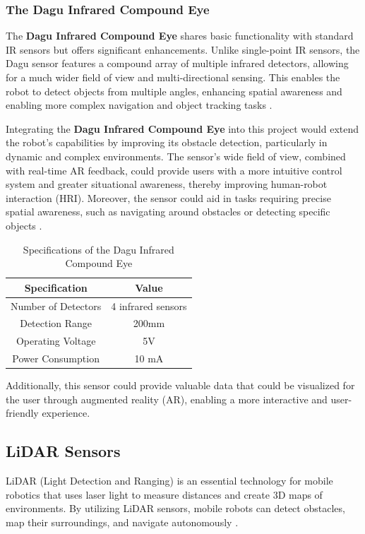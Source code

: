\subsubsection{The Dagu Infrared Compound Eye} 
The \textbf{Dagu Infrared Compound Eye} shares basic functionality with standard IR sensors but offers significant enhancements. Unlike single-point IR sensors, the Dagu sensor features a compound array of multiple infrared detectors, allowing for a much wider field of view and multi-directional sensing. This enables the robot to detect objects from multiple angles, enhancing spatial awareness and enabling more complex navigation and object tracking tasks \cite{rhydo2024}.

Integrating the \textbf{Dagu Infrared Compound Eye} into this project would extend the robot's capabilities by improving its obstacle detection, particularly in dynamic and complex environments. The sensor’s wide field of view, combined with real-time AR feedback, could provide users with a more intuitive control system and greater situational awareness, thereby improving human-robot interaction (HRI). Moreover, the sensor could aid in tasks requiring precise spatial awareness, such as navigating around obstacles or detecting specific objects \cite{benet2002infrared}.

\begin{table}[ht]
\centering
\caption{Specifications of the Dagu Infrared Compound Eye}
\begin{tabular}{|c|c|}
\hline
\textbf{Specification} & \textbf{Value} \\ \hline
Number of Detectors & 4 infrared sensors \\ \hline
Detection Range & 200mm \\ \hline
Operating Voltage & 5V \\ \hline
Power Consumption & 10 mA \\ \hline
\end{tabular}
\label{tab:dagu_infrared}
\end{table}


Additionally, this sensor could provide valuable data that could be visualized for the user through augmented reality (AR), enabling a more interactive and user-friendly experience.

\subsection{LiDAR Sensors} LiDAR (Light Detection and Ranging) is an essential technology for mobile robotics that uses laser light to measure distances and create 3D maps of environments. By utilizing LiDAR sensors, mobile robots can detect obstacles, map their surroundings, and navigate autonomously \cite{yang2022lidar}.

